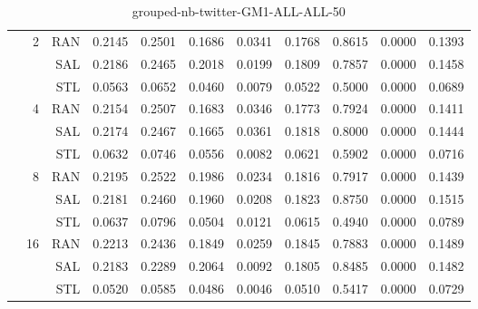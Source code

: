 \begin{center}
\begin{table}[htbp]
\begin{center}
\begin{tabular}{ | r | r | r | r | r | r | r | r | r | r | r |}
 & \multirow{3}{*}{2} & RAN & 0.2145 & 0.2501 & 0.1686 & 0.0341 & 0.1768 & 0.8615 & 0.0000 & 0.1393\\ \cline{3-11}
 &   & SAL & 0.2186 & 0.2465 & 0.2018 & 0.0199 & 0.1809 & 0.7857 & 0.0000 & 0.1458\\ \cline{3-11}
 &   & STL & 0.0563 & 0.0652 & 0.0460 & 0.0079 & 0.0522 & 0.5000 & 0.0000 & 0.0689\\ \cline{2-11}
 & \multirow{3}{*}{4} & RAN & 0.2154 & 0.2507 & 0.1683 & 0.0346 & 0.1773 & 0.7924 & 0.0000 & 0.1411\\ \cline{3-11}
 &   & SAL & 0.2174 & 0.2467 & 0.1665 & 0.0361 & 0.1818 & 0.8000 & 0.0000 & 0.1444\\ \cline{3-11}
 &   & STL & 0.0632 & 0.0746 & 0.0556 & 0.0082 & 0.0621 & 0.5902 & 0.0000 & 0.0716\\ \cline{2-11}
 & \multirow{3}{*}{8} & RAN & 0.2195 & 0.2522 & 0.1986 & 0.0234 & 0.1816 & 0.7917 & 0.0000 & 0.1439\\ \cline{3-11}
 &   & SAL & 0.2181 & 0.2460 & 0.1960 & 0.0208 & 0.1823 & 0.8750 & 0.0000 & 0.1515\\ \cline{3-11}
 &   & STL & 0.0637 & 0.0796 & 0.0504 & 0.0121 & 0.0615 & 0.4940 & 0.0000 & 0.0789\\ \cline{2-11}
 & \multirow{3}{*}{16} & RAN & 0.2213 & 0.2436 & 0.1849 & 0.0259 & 0.1845 & 0.7883 & 0.0000 & 0.1489\\ \cline{3-11}
 &   & SAL & 0.2183 & 0.2289 & 0.2064 & 0.0092 & 0.1805 & 0.8485 & 0.0000 & 0.1482\\ \cline{3-11}
 &   & STL & 0.0520 & 0.0585 & 0.0486 & 0.0046 & 0.0510 & 0.5417 & 0.0000 & 0.0729\\ \cline{2-11}
\hline
\end{tabular}
\caption{grouped-nb-twitter-GM1-ALL-ALL-50}
\end{center}
 \end{table}
\end{center}

